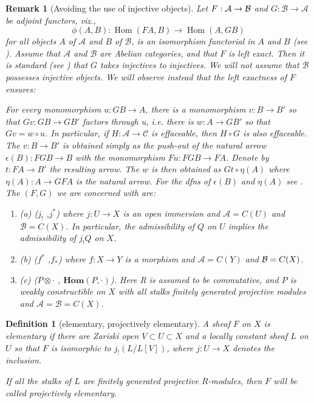 \documentclass[10pt,twoside]{article}
\newtheorem{defn}[thm]{Definition}
\newcommand{\Hom}{{\operatorname{Hom}}}
\newcommand{\HHom}{{\mathbf{Hom}}}
\newtheorem{remark}[thm]{Remark}
\begin{document}
\begin{remark}[Avoiding the use of injective objects] 
Let $F: \mathcal{A} \to\nolinebreak \mathcal{B}$
and $G:\mathcal{B} \to \mathcal{A}$ be adjoint functors,
viz., 
$$
\phi (A,B) :\Hom(FA,B) \to \Hom(A,GB)
$$ 
for all objects $A$ of $\mathcal{A}$
 and $B$ of $\mathcal{B}$, is an 
\emph{isomorphism} functorial in $A$ and $B$ (see \cite[Chapter~IV,~page~80]{nori:Mac}). Assume that $\mathcal{A}$
and $\mathcal{B}$ are Abelian categories, and that $F$ is left
exact. Then it is standard (see \cite{nori:Toh}) that $G$ takes injectives to
injectives. We will not assume that $\mathcal{B}$ 
possesses injective objects. We will observe instead that the 
left exactness of $F$ ensures:
   
\emph{For every monomorphism} $u:GB \to A$, \emph{there is a monomorphism} 
\linebreak $v:B\to B'$ \emph{so that} $Gv:GB \to GB'$ \emph{factors through
 u, i.e. there is} $w:A \to GB'$ \emph{so that} $Gv=w \circ u$.
 \emph{In particular, if} $H: \mathcal{A} \to \mathcal{C}$ \emph
{is effaceable, then} $H \circ G$ \emph{is also effaceable.}
The  $v:B \to B'$ is obtained simply as the push-out of the
 natural arrow $\epsilon (B): FGB \to B$ with the monomorphism $Fu:FGB \to FA$.
Denote by $t:FA \to B'$ the resulting arrow. The $w$ is
then obtained as $Gt\circ \eta (A)$ where $\eta (A):A \to GFA$
is the natural arrow. For the dfns of $\epsilon (B)$
 and $\eta (A)$ see \cite[Thm.~1,~page~82]{nori:Mac}.
 The $(F,G)$ we are concerned with are:
\begin {enumerate}
\item [(a)] ($j_!$ ,$j^*$) where $j:U \to X$ is an open immersion and
 $\mathcal{A}=C(U)$ and $\mathcal{B}=C(X)$. In particular,
 the admissibility
of $Q$ on $U$ implies the admissibility of $j_!Q$ on $X$.

\item [(b)] ($f^*$ ,$f_*$) where $f:X \to Y$ is a morphism and 
 $\mathcal{A}=C(Y)$ and $\mathcal{B}=\nolinebreak C(X)$.

\item [(c)] ($P \otimes \cdot$ , $\HHom(P,\cdot)$). 
Here R is assumed to be commutative, and $P$ is weakly constructible 
on $X$ with all stalks finitely generated projective modules  
and $\mathcal{A}=\mathcal{B}=C(X)$. 
\end{enumerate}
\end{remark}

\renewcommand{\thethm}{3.9}
\begin{defn}[elementary, projectively elementary] 
A sheaf $F$ on $X$ 
is elementary if there are Zariski open  $V \subset U \subset X$
and a locally constant sheaf $L$ on $U$ so that $F$ is 
isomorphic to $j_!(L/L[V])$, where 
 $j:U \to X$ denotes the inclusion.

If all the stalks of $L$ are finitely generated projective 
 $R$-modules, then $F$ will be called \emph{projectively elementary}.  
\end{defn}
\end{document}
